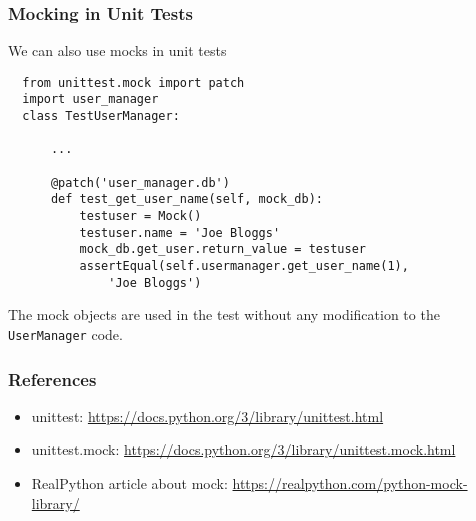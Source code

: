 \documentclass[10pt]{beamer}
\begin{document}
\begin{frame}[fragile]
  \frametitle{Mocking in Unit Tests}
  
  We can also use mocks in unit tests
  
  \begin{verbatim}
  from unittest.mock import patch
  import user_manager
  class TestUserManager:
      
      ...
      
      @patch('user_manager.db')
      def test_get_user_name(self, mock_db):
          testuser = Mock()
          testuser.name = 'Joe Bloggs'
          mock_db.get_user.return_value = testuser
          assertEqual(self.usermanager.get_user_name(1),
              'Joe Bloggs')                     
  \end{verbatim} 
  
  The mock objects are used in the test without any modification to the \texttt{UserManager} code.
   
\end{frame}

\begin{frame}
  \frametitle{References}
  
  \begin{itemize}
    \item unittest: \url{https://docs.python.org/3/library/unittest.html}
    \item unittest.mock: \url{https://docs.python.org/3/library/unittest.mock.html}
    \item RealPython article about mock: \url{https://realpython.com/python-mock-library/}
  \end{itemize}      
\end{frame}
\end{document}
